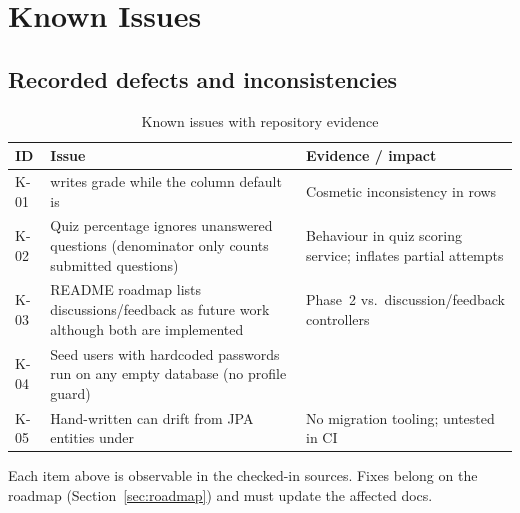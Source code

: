 \section{Known Issues}
\label{sec:known-issues}

\subsection{Recorded defects and inconsistencies}

\begin{table}[H]
\centering
\caption{Known issues with repository evidence}
\label{tab:known-issues}
\begin{tabular}{@{}L{2.2cm}L{6.0cm}L{6.0cm}@{}}
\toprule
\textbf{ID} & \textbf{Issue} & \textbf{Evidence / impact} \\
\midrule
K-01 &  writes grade  while the column default is  & Cosmetic inconsistency in  rows \\
K-02 & Quiz percentage ignores unanswered questions (denominator only counts submitted questions) & Behaviour in quiz scoring service; inflates partial attempts \\
K-03 & README roadmap lists discussions/feedback as future work although both are implemented &  Phase~2 vs.\ discussion/feedback controllers \\
K-04 & Seed users with hardcoded passwords run on any empty database (no profile guard) &  \\
K-05 & Hand-written  can drift from JPA entities under  & No migration tooling; untested in CI \\
\bottomrule
\end{tabular}
\end{table}

\noindent Each item above is observable in the checked-in sources. Fixes belong on the roadmap (Section~\ref{sec:roadmap}) and must update the affected docs.
